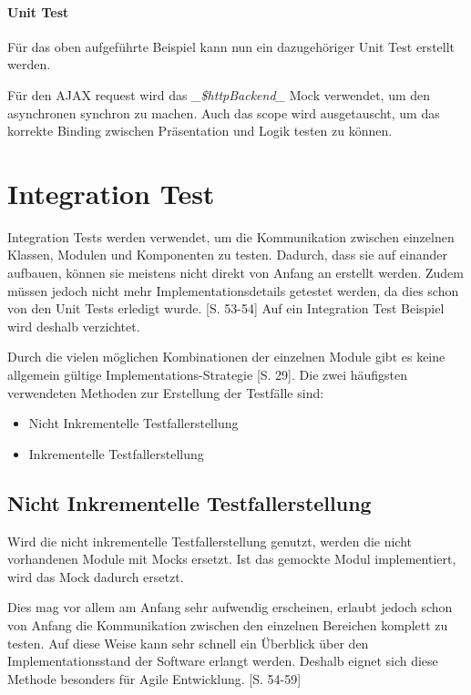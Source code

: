 \documentclass[a4paper,bibtotoc,oneside]{scrbook}
\begin{document}
\subsubsection{Unit Test}
Für das oben aufgeführte Beispiel kann nun ein dazugehöriger Unit Test erstellt werden.



Für den AJAX request wird das \emph{\_\$httpBackend\_} Mock verwendet, um den asynchronen synchron zu machen. Auch das scope wird ausgetauscht, um das korrekte Binding zwischen Präsentation und Logik testen zu können.


\chapter{Integration Test}
Integration Tests werden verwendet, um die Kommunikation zwischen einzelnen Klassen, Modulen und Komponenten zu testen. Dadurch, dass sie auf einander aufbauen, können sie meistens nicht direkt von Anfang an erstellt werden. Zudem müssen jedoch nicht mehr Implementationsdetails getestet werden, da dies schon von den Unit Tests erledigt wurde. \cite{test_large_systems}[S. 53-54]
Auf ein Integration Test Beispiel wird deshalb verzichtet.

Durch die vielen möglichen Kombinationen der einzelnen Module gibt es keine allgemein gültige Implementations-Strategie \cite{betrieb}[S. 29]. Die zwei häufigsten verwendeten Methoden zur Erstellung der Testfälle sind:

\begin{itemize}
	\item Nicht Inkrementelle Testfallerstellung
	\item Inkrementelle Testfallerstellung
\end{itemize}

\section{Nicht Inkrementelle Testfallerstellung}
Wird die nicht inkrementelle Testfallerstellung genutzt, werden die nicht vorhandenen Module mit Mocks ersetzt. Ist das gemockte Modul implementiert, wird das Mock dadurch ersetzt. 

Dies mag vor allem am Anfang sehr aufwendig erscheinen, erlaubt jedoch schon von Anfang die Kommunikation zwischen den einzelnen Bereichen komplett zu testen. Auf diese Weise kann sehr schnell ein Überblick über den Implementationsstand der Software erlangt werden. Deshalb eignet sich diese Methode besonders für Agile Entwicklung. \cite{test_large_systems}[S. 54-59] 
\end{document}
